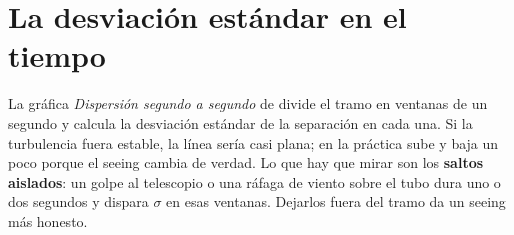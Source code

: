 \section{La desviación estándar en el tiempo}

La gráfica \emph{Dispersión segundo a segundo} de  divide el tramo en ventanas de un segundo y calcula
la desviación estándar de la separación en cada una. Si la turbulencia fuera estable, la línea sería casi plana; en la
práctica sube y baja un poco porque el seeing cambia de verdad. Lo que hay que mirar son los \textbf{saltos aislados}:
un golpe al telescopio o una ráfaga de viento sobre el tubo dura uno o dos segundos y dispara $\sigma$ en esas ventanas.
Dejarlos fuera del tramo da un seeing más honesto.

